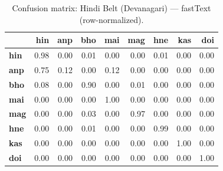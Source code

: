 \begin{table}[htbp]
\centering
\small
\begin{tabular}{lrrrrrrrr}
\toprule
 & \textbf{hin} & \textbf{anp} & \textbf{bho} & \textbf{mai} & \textbf{mag} & \textbf{hne} & \textbf{kas} & \textbf{doi} \\
\midrule
\textbf{hin} & \cellcolor{blue!97}\color{white}0.98 & \cellcolor{blue!0}0.00 & \cellcolor{blue!0}0.01 & \cellcolor{blue!0}0.00 & \cellcolor{blue!0}0.00 & \cellcolor{blue!1}0.01 & \cellcolor{blue!0}0.00 & \cellcolor{blue!0}0.00 \\
\textbf{anp} & \cellcolor{blue!75}\color{white}0.75 & \cellcolor{blue!12}0.12 & \cellcolor{blue!0}0.00 & \cellcolor{blue!12}0.12 & \cellcolor{blue!0}0.00 & \cellcolor{blue!0}0.00 & \cellcolor{blue!0}0.00 & \cellcolor{blue!0}0.00 \\
\textbf{bho} & \cellcolor{blue!8}0.08 & \cellcolor{blue!0}0.00 & \cellcolor{blue!90}\color{white}0.90 & \cellcolor{blue!0}0.00 & \cellcolor{blue!1}0.01 & \cellcolor{blue!0}0.00 & \cellcolor{blue!0}0.00 & \cellcolor{blue!0}0.00 \\
\textbf{mai} & \cellcolor{blue!0}0.00 & \cellcolor{blue!0}0.00 & \cellcolor{blue!0}0.00 & \cellcolor{blue!100}\color{white}1.00 & \cellcolor{blue!0}0.00 & \cellcolor{blue!0}0.00 & \cellcolor{blue!0}0.00 & \cellcolor{blue!0}0.00 \\
\textbf{mag} & \cellcolor{blue!0}0.00 & \cellcolor{blue!0}0.00 & \cellcolor{blue!3}0.03 & \cellcolor{blue!0}0.00 & \cellcolor{blue!96}\color{white}0.97 & \cellcolor{blue!0}0.00 & \cellcolor{blue!0}0.00 & \cellcolor{blue!0}0.00 \\
\textbf{hne} & \cellcolor{blue!0}0.00 & \cellcolor{blue!0}0.00 & \cellcolor{blue!1}0.01 & \cellcolor{blue!0}0.00 & \cellcolor{blue!0}0.00 & \cellcolor{blue!98}\color{white}0.99 & \cellcolor{blue!0}0.00 & \cellcolor{blue!0}0.00 \\
\textbf{kas} & \cellcolor{blue!0}0.00 & \cellcolor{blue!0}0.00 & \cellcolor{blue!0}0.00 & \cellcolor{blue!0}0.00 & \cellcolor{blue!0}0.00 & \cellcolor{blue!0}0.00 & \cellcolor{blue!100}\color{white}1.00 & \cellcolor{blue!0}0.00 \\
\textbf{doi} & \cellcolor{blue!0}0.00 & \cellcolor{blue!0}0.00 & \cellcolor{blue!0}0.00 & \cellcolor{blue!0}0.00 & \cellcolor{blue!0}0.00 & \cellcolor{blue!0}0.00 & \cellcolor{blue!0}0.00 & \cellcolor{blue!100}\color{white}1.00 \\
\bottomrule
\end{tabular}
\caption{Confusion matrix: Hindi Belt (Devanagari) — fastText (row-normalized).}
\label{tab:cm-hindi_belt-fasttext}
\end{table}